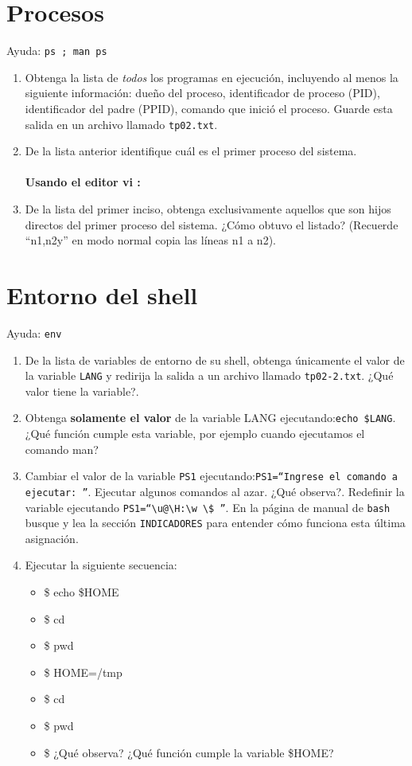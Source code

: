 \documentclass[12pt]{article}
\begin{document}
\section*{Procesos}
Ayuda: \texttt{ps ; man ps}
\begin{enumerate}
\item Obtenga la lista de \textit{todos} los programas en ejecución, incluyendo al menos la siguiente información:
dueño del proceso, identificador de proceso (PID), identificador del padre (PPID),
comando que inició el proceso. Guarde esta salida en un archivo llamado \texttt{tp02.txt}.
\item De la lista anterior identifique cuál es el primer proceso del sistema. \\ \\
\textbf{Usando el editor vi :} 
\item De la lista del primer inciso, obtenga exclusivamente aquellos que son hijos directos del primer proceso del sistema. ¿Cómo obtuvo el listado? (Recuerde ``n1,n2y'' en modo normal copia las líneas n1 a n2).
\end{enumerate}

\section*{Entorno del shell}
Ayuda: \texttt{env}
\begin{enumerate}
\item De la lista de variables de entorno de su shell, obtenga únicamente el valor de la variable \texttt{LANG} y redirija la salida a un archivo llamado \texttt{tp02-2.txt}. ¿Qué valor tiene la variable?.

\item Obtenga \textbf{solamente el valor} de la variable LANG ejecutando:\texttt{echo \$LANG}. ¿Qué función cumple esta variable, por ejemplo cuando ejecutamos el comando man? 
\item Cambiar el valor de la variable \texttt{PS1} ejecutando:\texttt{PS1=``Ingrese el comando a ejecutar: ''}.
Ejecutar algunos comandos al azar. ¿Qué observa?. Redefinir la variable ejecutando
\texttt{PS1=``\textbackslash u@\textbackslash H:\textbackslash w \textbackslash \$ ''}.
En la página de manual de \texttt{bash} busque y lea la sección \texttt{INDICADORES} para entender cómo funciona esta última asignación.
\item Ejecutar la siguiente secuencia:
	\begin{itemize}
	\item \$ echo \$HOME
	\item \$ cd 
	\item \$ pwd
	\item \$ HOME=/tmp
	\item \$ cd 
	\item \$ pwd
	\item \$ ¿Qué observa? ¿Qué función cumple la variable \$HOME?
	\end{itemize}
\end{enumerate}
\end{document}
